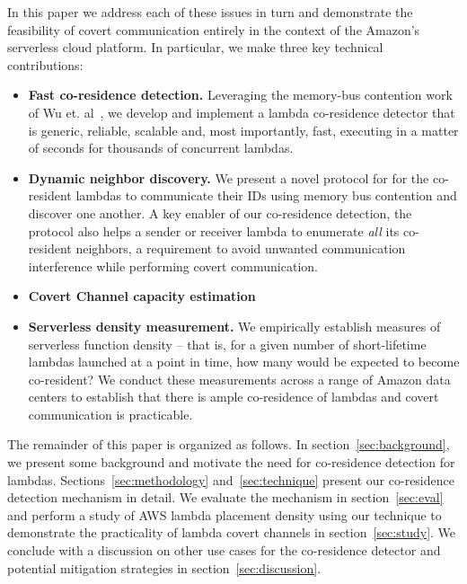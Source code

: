 In this paper we address each of these issues in turn and demonstrate
the feasibility of covert communication entirely in the context of the
Amazon's serverless cloud platform.  In particular, we make three key technical
contributions:
\begin{itemize}
\item{\bf{Fast co-residence detection.}}  Leveraging the memory-bus contention
  work of Wu et. al~\cite{wuusenix2012}, we develop and implement a
  lambda co-residence detector that is generic, reliable, scalable
  and, most importantly, fast, executing in a matter of seconds for thousands of
  concurrent lambdas.
\item{\bf{Dynamic neighbor discovery.}}  We present a novel protocol for  
  for the co-resident lambdas to communicate their IDs using memory 
  bus contention and discover one another. A key enabler of our co-residence detection,
  the protocol also helps a sender or receiver lambda to enumerate \emph{all} 
  its co-resident neighbors, a requirement to avoid unwanted communication 
  interference while performing covert communication.
\item{\bf{Covert Channel capacity estimation}} \todo{}
\item{\bf{Serverless density measurement.}}  We empirically establish
  measures of serverless function density -- that is, for a given
  number of short-lifetime lambdas launched at a point in time, how
  many would be expected to become co-resident?  We conduct these
  measurements across a range of Amazon data centers to establish that
  there is ample co-residence of lambdas and covert communication is practicable.
\end{itemize}



The remainder of this paper is organized as follows. In section~\ref{sec:background}, 
we present some background and motivate the need for 
co-residence detection for lambdas. Sections~\ref{sec:methodology} and~\ref{sec:technique} 
present our co-residence detection mechanism in detail. 
We evaluate the mechanism in section~\ref{sec:eval} and 
perform a study of AWS lambda placement density using our technique 
to demonstrate the practicality of lambda covert channels in section~\ref{sec:study}.
We conclude with a discussion on other use cases for the co-residence detector and potential 
mitigation strategies in section~\ref{sec:discussion}.

